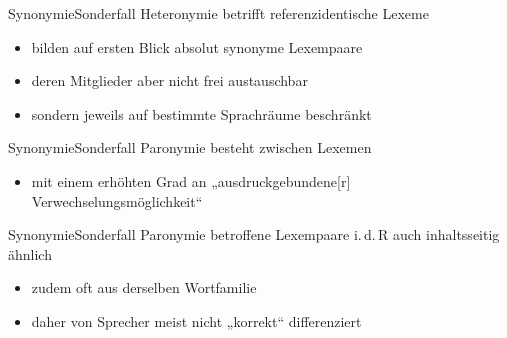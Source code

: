 \begin{frame}{Synonymie}{Sonderfall Heteronymie}
\onslide<+->
betrifft referenzidentische Lexeme
\begin{itemize}[<+->]
	\item		bilden auf ersten Blick absolut synonyme Lexempaare
	\item		deren Mitglieder aber nicht frei austauschbar
	\item		sondern jeweils auf bestimmte Sprachräume beschränkt
\end{itemize}
\onslide<+->
\Zeile
\begin{exe}
	\ex\label{ex:synonymie-009}
    \begin{xlist}
		 \onslide<+->
		 \onslide<+->
	\end{xlist}
\end{exe}
\end{frame}

\begin{frame}{Synonymie}{Sonderfall Paronymie}
\onslide<+->
besteht zwischen Lexemen
\begin{itemize}[<+->]
	\item		mit einem erhöhten Grad an „ausdruckgebundene[r] Verwechselungsmöglichkeit“ \citep[1120]{Hausmann1990}
\end{itemize}
\onslide<+->
\Zeile
\begin{exe}
	\ex\label{ex:synonymie-010}
    \begin{xlist}
		 \onslide<+->
		 \onslide<+->
	\end{xlist}
\end{exe}
\end{frame}

\begin{frame}{Synonymie}{Sonderfall Paronymie}
\onslide<+->
betroffene Lexempaare i.\,d.\,R auch inhaltsseitig ähnlich
\begin{itemize}[<+->]
	\item		zudem oft aus derselben Wortfamilie
	\item		daher von Sprecher meist nicht „korrekt“ differenziert
\end{itemize}
\onslide<+->
\Zeile
\begin{exe}
\end{exe}
\end{frame}

